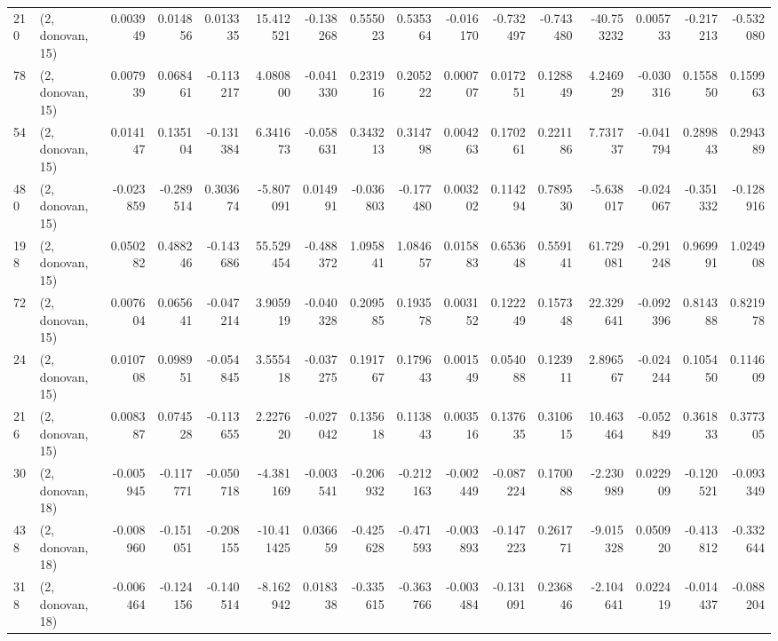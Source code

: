 \begin{tabular}{llrrrrrrrrrrrrrr}
210 &  (2, donovan, 15) &   0.003949 &  0.014856 &  0.013335 &   15.412521 & -0.138268 &   0.555023 &  0.535364 & -0.016170 & -0.732497 & -0.743480 &  -40.753232 &  0.005733 & -0.217213 & -0.532080 \\
78  &  (2, donovan, 15) &   0.007939 &  0.068461 & -0.113217 &    4.080800 & -0.041330 &   0.231916 &  0.205222 &  0.000707 &  0.017251 &  0.128849 &    4.246929 & -0.030316 &  0.155850 &  0.159963 \\
54  &  (2, donovan, 15) &   0.014147 &  0.135104 & -0.131384 &    6.341673 & -0.058631 &   0.343213 &  0.314798 &  0.004263 &  0.170261 &  0.221186 &    7.731737 & -0.041794 &  0.289843 &  0.294389 \\
480 &  (2, donovan, 15) &  -0.023859 & -0.289514 &  0.303674 &   -5.807091 &  0.014991 &  -0.036803 & -0.177480 &  0.003202 &  0.114294 &  0.789530 &   -5.638017 & -0.024067 & -0.351332 & -0.128916 \\
198 &  (2, donovan, 15) &   0.050282 &  0.488246 & -0.143686 &   55.529454 & -0.488372 &   1.095841 &  1.084657 &  0.015883 &  0.653648 &  0.559141 &   61.729081 & -0.291248 &  0.969991 &  1.024908 \\
72  &  (2, donovan, 15) &   0.007604 &  0.065641 & -0.047214 &    3.905919 & -0.040328 &   0.209585 &  0.193578 &  0.003152 &  0.122249 &  0.157348 &   22.329641 & -0.092396 &  0.814388 &  0.821978 \\
24  &  (2, donovan, 15) &   0.010708 &  0.098951 & -0.054845 &    3.555418 & -0.037275 &   0.191767 &  0.179643 &  0.001549 &  0.054088 &  0.123911 &    2.896567 & -0.024244 &  0.105450 &  0.114609 \\
216 &  (2, donovan, 15) &   0.008387 &  0.074528 & -0.113655 &    2.227620 & -0.027042 &   0.135618 &  0.113843 &  0.003516 &  0.137635 &  0.310615 &   10.463464 & -0.052849 &  0.361833 &  0.377305 \\
30  &  (2, donovan, 18) &  -0.005945 & -0.117771 & -0.050718 &   -4.381169 & -0.003541 &  -0.206932 & -0.212163 & -0.002449 & -0.087224 &  0.170088 &   -2.230989 &  0.022909 & -0.120521 & -0.093349 \\
438 &  (2, donovan, 18) &  -0.008960 & -0.151051 & -0.208155 &  -10.411425 &  0.036659 &  -0.425628 & -0.471593 & -0.003893 & -0.147223 &  0.261771 &   -9.015328 &  0.050920 & -0.413812 & -0.332644 \\
318 &  (2, donovan, 18) &  -0.006464 & -0.124156 & -0.140514 &   -8.162942 &  0.018338 &  -0.335615 & -0.363766 & -0.003484 & -0.131091 &  0.236846 &   -2.104641 &  0.022419 & -0.014437 & -0.088204 \\

\end{tabular}
